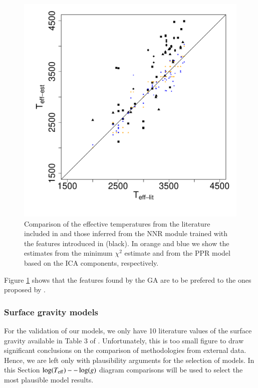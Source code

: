 \begin {figure}
 \centering
  \includegraphics[scale=0.45]{figs/irtf-CESteffs-literature.pdf}
  
  \caption{Comparison of the effective temperatures from the
  literature included in \cite{cesetti} and those inferred from the
  NNR module trained with the features introduced in \cite{cesetti}
  (black). In orange and blue we show the estimates from the minimum
  $\chi^2$ estimate and from the PPR model based on the ICA
  components, respectively.}

\label{fig:irtf-cesteff}
\end {figure}

Figure \ref{fig:irtf-cesteff} shows that the features found by the GA
are to be prefered to the ones proposed by \cite{cesetti}. 

\subsubsection{Surface gravity models}

For the validation of our models, we only have 10 literature values of
the surface gravity available in Table 3 of
\cite{cesetti}. Unfortunately, this is too small figure to draw
significant conclusions on the comparison of methodologies from
external data. Hence, we are left only with plausibility arguments for
the selection of models. In this Section $\log(T_{\rm
eff})--\log(g)$ diagram comparisons will be used to select the most 
plausible model results. 

